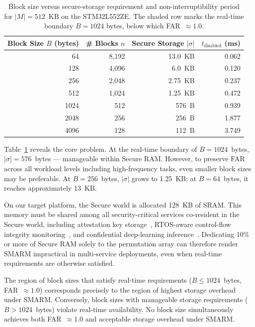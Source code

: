 \documentclass[a4paper,10pt]{article}
\begin{document}
{\begin{table}[H]
    \centering
    \caption{Block size versus secure-storage requirement and
    non-interruptibility period for $|M| = 512$~KB on the STM32L552ZE.
    The shaded row marks the real-time boundary $B = 1024$ bytes, below
    which FAR~$\approx 1.0$.}
    \label{tab:storage-tradeoff}
    \begin{tabular}{rrrr}
        \toprule
        \textbf{Block Size $B$ (bytes)} & \textbf{\# Blocks $n$} &
        \textbf{Secure Storage $|\sigma|$} &
        \textbf{$t_{\text{disabled}}$ (ms)} \\
        \midrule
        64    & 8{,}192 & 13.0~KB  & 0.062 \\
        128   & 4{,}096 & 6.0~KB   & 0.120 \\
        256   & 2{,}048 & 2.75~KB  & 0.237 \\
        512   & 1{,}024 & 1.25~KB  & 0.472 \\
        \rowcolor{gray!15}
        1024  & 512     & 576~B    & 0.939 \\
        2048  & 256     & 256~B    & 1.877 \\
        4096  & 128     & 112~B    & 3.749 \\
        \bottomrule
    \end{tabular}
\end{table}

Table~\ref{tab:storage-tradeoff} reveals the core problem. At 
the real-time boundary of $B = 1024$~bytes, $|\sigma| = 576$~bytes — 
manageable within Secure RAM. However, to preserve FAR across all workload 
levels including high-frequency tasks, even smaller block sizes may be 
preferable. At $B = 256$~bytes, $|\sigma|$ grows to 1.25~KB; at $B = 
64$~bytes, it reaches approximately 13~KB.

On our target platform, the Secure world is allocated 128~KB of SRAM. 
This memory must be shared among all security-critical services co-resident 
in the Secure world, including attestation key storage~\cite{silabs2020an1271}, 
RTOS-aware control-flow integrity monitoring~\cite{kawada2021tzmcfi}, and 
confidential deep-learning inference~\cite{islam2023confidential}. 
Dedicating 10\% or more of Secure RAM solely to the permutation array can 
therefore render SMARM impractical in multi-service deployments, even when 
real-time requirements are otherwise satisfied.

The region of block sizes that satisfy real-time requirements 
($B \leq 1024$~bytes, FAR~$\approx 1.0$) corresponds precisely to the 
region of highest storage overhead under SMARM. Conversely, block sizes 
with manageable storage requirements ($B > 1024$~bytes) violate real-time 
availability. No block size simultaneously achieves both 
FAR~$\approx 1.0$ and acceptable storage overhead under SMARM.

}
\end{document}
